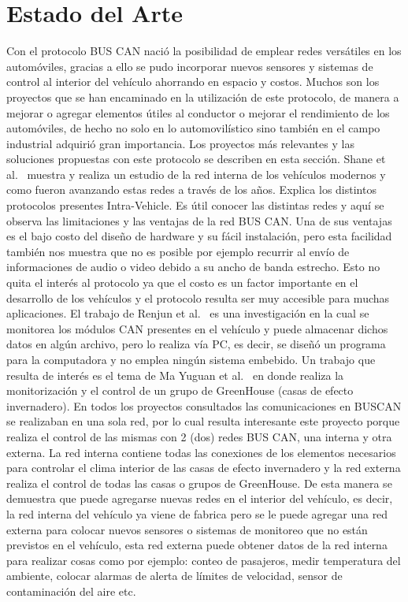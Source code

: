 \section{Estado del Arte}

Con el protocolo BUS CAN nació la posibilidad de emplear redes versátiles en los automóviles, gracias a ello se pudo incorporar nuevos sensores y sistemas de control al interior del vehículo ahorrando en espacio y costos. 
Muchos son los proyectos que se han encaminado en la utilización de este protocolo, de manera a mejorar o agregar elementos útiles al conductor o mejorar el rendimiento de los automóviles, de hecho no solo en lo automovilístico sino también en el campo industrial adquirió gran importancia. 
Los proyectos más relevantes y las soluciones propuestas con este protocolo se describen en esta sección. Shane et al.~\cite{IVN} muestra y realiza un estudio de la red interna de los vehículos modernos y como fueron avanzando estas redes a través de los años. 
Explica los distintos protocolos presentes Intra-Vehicle. Es útil conocer las distintas redes y aquí se observa las limitaciones y las ventajas de la red BUS CAN. 
Una de sus ventajas es el bajo costo del diseño de hardware y su fácil instalación, pero esta facilidad también nos muestra que no es posible por ejemplo recurrir al envío de informaciones de audio o video debido a su ancho de banda estrecho. 
Esto no quita el interés al protocolo ya que el costo es un factor importante en el desarrollo de los vehículos y el protocolo resulta ser muy accesible para muchas aplicaciones. 
El trabajo de Renjun et al.~\cite{CMS} es una investigación en la cual se monitorea los módulos CAN presentes en el vehículo y puede almacenar dichos datos en algún archivo, pero lo realiza vía PC, es decir, se diseñó un programa para la computadora y no emplea ningún sistema embebido. 
Un trabajo que resulta de interés es el tema de Ma Yuguan et al.~\cite {GHG} en donde realiza la monitorización y el control de un grupo de GreenHouse (casas de efecto invernadero). 
En todos los proyectos consultados las comunicaciones en BUSCAN se realizaban en una sola red, por lo cual resulta interesante  este proyecto porque realiza el control de las mismas con 2 (dos) redes  BUS CAN, una interna y otra externa. 
La red interna contiene todas las conexiones de los elementos necesarios para controlar el clima interior de las casas de efecto invernadero y la red externa realiza el control de todas las casas o grupos de GreenHouse.  
De esta manera se demuestra que puede agregarse nuevas redes en el interior del vehículo, es decir, la red interna del vehículo ya viene de fabrica pero se le puede agregar una red externa para colocar nuevos sensores o sistemas de monitoreo que no están previstos en el vehículo, esta red externa puede obtener datos de la red interna para realizar cosas como por ejemplo: conteo de pasajeros, medir  temperatura del ambiente, colocar alarmas de alerta de límites de velocidad, sensor de contaminación del aire etc. 
